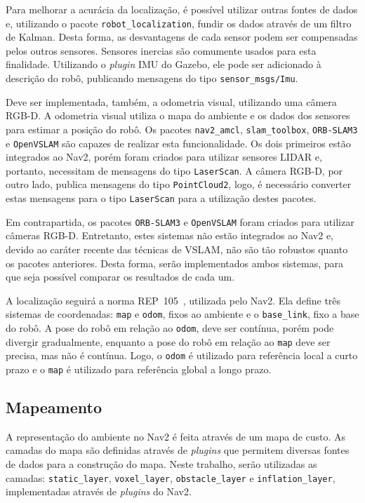 \documentclass[repeatfields,xlists,xpacks,oneside,yearsonly]{ufrgscca}
\begin{document}
Para melhorar a acurácia da localização, é possível utilizar outras fontes de
dados e, utilizando o pacote \texttt{robot\_localization}, fundir os dados
através de um filtro de Kalman.
Desta forma, as desvantagens de cada sensor podem ser compensadas pelos outros
sensores.
Sensores inercias são comumente usados para esta finalidade.
Utilizando o \textit{plugin} IMU do Gazebo, ele pode ser adicionado à descrição
do robô, publicando mensagens do tipo \texttt{sensor\_msgs/Imu}.


Deve ser implementada, também, a odometria visual, utilizando uma câmera RGB-D.
A odometria visual utiliza o mapa do ambiente e os dados dos sensores para estimar
a posição do robô.
Os pacotes \texttt{nav2\_amcl}, \texttt{slam\_toolbox}, \texttt{ORB-SLAM3}
e \texttt{OpenVSLAM} são capazes de realizar esta funcionalidade.
Os dois primeiros estão integrados ao Nav2,
porém foram criados para utilizar sensores LIDAR e, portanto,
necessitam de mensagens do tipo \texttt{LaserScan}.
A câmera RGB-D, por outro lado, publica mensagens do tipo \texttt{PointCloud2},
logo, é necessário converter estas mensagens para o tipo \texttt{LaserScan}
para a utilização destes pacotes.

Em contrapartida, os pacotes \texttt{ORB-SLAM3} e \texttt{OpenVSLAM} foram
criados para utilizar câmeras RGB-D. Entretanto, estes sistemas não estão
integrados ao Nav2 e, devido ao caráter recente das técnicas de
VSLAM, não são tão robustos quanto os pacotes anteriores.
Desta forma, serão implementados ambos sistemas, para que seja possível
comparar os resultados de cada um.

A localização seguirá a norma REP~105~\cite{rep_105}, utilizada pelo Nav2.
Ela define três sistemas de coordenadas: \texttt{map} e \texttt{odom}, fixos ao
ambiente e o \texttt{base\_link}, fixo a base do robô.
A pose do robô em relação ao \texttt{odom}, deve ser contínua, porém pode
divergir gradualmente, enquanto a pose do robô em relação ao
\texttt{map} deve ser precisa, mas não é contínua.
Logo, o \texttt{odom} é utilizado para referência local a curto prazo e o
\texttt{map} é utilizado para referência global a longo prazo.

\subsection{Mapeamento}

A representação do ambiente no Nav2 é feita através de um mapa de custo.
As camadas do mapa são definidas através de \textit{plugins} que permitem
diversas fontes de dados para a construção do mapa.
Neste trabalho, serão utilizadas as camadas: \texttt{static\_layer},
\texttt{voxel\_layer}, \texttt{obstacle\_layer} e \texttt{inflation\_layer},
implementadas através de \textit{plugins} do Nav2.
\end{document}
